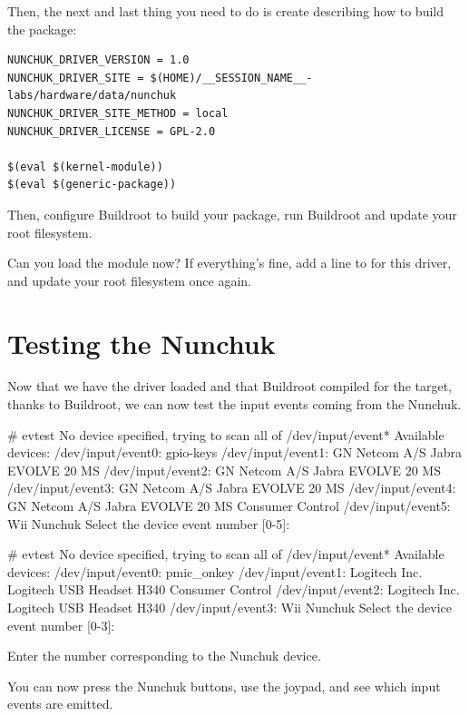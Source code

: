 Then, the next and last thing you need to do is create
 describing how to build
the package:

\begin{verbatim}
NUNCHUK_DRIVER_VERSION = 1.0
NUNCHUK_DRIVER_SITE = $(HOME)/__SESSION_NAME__-labs/hardware/data/nunchuk
NUNCHUK_DRIVER_SITE_METHOD = local
NUNCHUK_DRIVER_LICENSE = GPL-2.0

$(eval $(kernel-module))
$(eval $(generic-package))
\end{verbatim}

Then, configure Buildroot to build your package, run Buildroot and
update your root filesystem.

Can you load the  module now? If everything's fine, add a
line to  for this driver, and update your
root filesystem once again.

\section{Testing the Nunchuk}

Now that we have the  driver loaded and that Buildroot compiled
 for the target, thanks to Buildroot, we can now test the input
events coming from the Nunchuk.


\if{}
\begin{bashinput}
# evtest
No device specified, trying to scan all of /dev/input/event*
Available devices:
/dev/input/event0:	gpio-keys
/dev/input/event1:	GN Netcom A/S Jabra EVOLVE 20 MS
/dev/input/event2:	GN Netcom A/S Jabra EVOLVE 20 MS
/dev/input/event3:	GN Netcom A/S Jabra EVOLVE 20 MS
/dev/input/event4:	GN Netcom A/S Jabra EVOLVE 20 MS Consumer Control
/dev/input/event5:	Wii Nunchuk
Select the device event number [0-5]:
\end{bashinput}
\else
\begin{bashinput}
# evtest
No device specified, trying to scan all of /dev/input/event*
Available devices:
/dev/input/event0:	pmic_onkey
/dev/input/event1:	Logitech Inc. Logitech USB Headset H340 Consumer Control
/dev/input/event2:	Logitech Inc. Logitech USB Headset H340
/dev/input/event3:	Wii Nunchuk
Select the device event number [0-3]:
\end{bashinput}
\fi

Enter the number corresponding to the Nunchuk device.

You can now press the Nunchuk buttons, use the joypad, and see which
input events are emitted.

